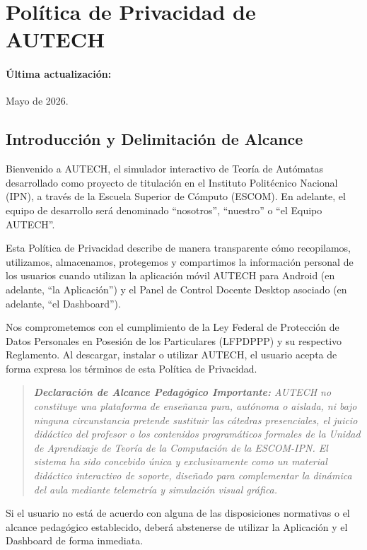 \section{Política de Privacidad de AUTECH}
\label{sec:politica_privacidad}

\paragraph{Última actualización:} Mayo de 2026.

\subsection{Introducción y Delimitación de Alcance}
\label{subsec:privacidad_introduccion}

Bienvenido a AUTECH, el simulador interactivo de Teoría de Autómatas desarrollado como proyecto de titulación en el Instituto Politécnico Nacional (IPN), a través de la Escuela Superior de Cómputo (ESCOM). En adelante, el equipo de desarrollo será denominado ``nosotros'', ``nuestro'' o ``el Equipo AUTECH''.

Esta Política de Privacidad describe de manera transparente cómo recopilamos, utilizamos, almacenamos, protegemos y compartimos la información personal de los usuarios cuando utilizan la aplicación móvil AUTECH para Android (en adelante, ``la Aplicación'') y el Panel de Control Docente Desktop asociado (en adelante, ``el Dashboard'').

Nos comprometemos con el cumplimiento de la Ley Federal de Protección de Datos Personales en Posesión de los Particulares (LFPDPPP) y su respectivo Reglamento. Al descargar, instalar o utilizar AUTECH, el usuario acepta de forma expresa los términos de esta Política de Privacidad. 

\begin{quote}
    \small \textit{\textbf{Declaración de Alcance Pedagógico Importante:} AUTECH no constituye una plataforma de enseñanza pura, autónoma o aislada, ni bajo ninguna circunstancia pretende sustituir las cátedras presenciales, el juicio didáctico del profesor o los contenidos programáticos formales de la Unidad de Aprendizaje de Teoría de la Computación de la ESCOM-IPN. El sistema ha sido concebido única y exclusivamente como un material didáctico interactivo de soporte, diseñado para complementar la dinámica del aula mediante telemetría y simulación visual gráfica.}
\end{quote}

Si el usuario no está de acuerdo con alguna de las disposiciones normativas o el alcance pedagógico establecido, deberá abstenerse de utilizar la Aplicación y el Dashboard de forma inmediata.

